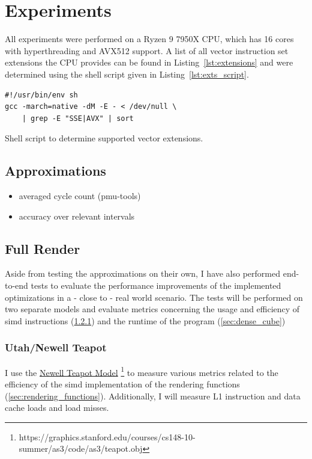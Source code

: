 \documentclass[a4paper, 11pt]{memoir}
\begin{document}
    \chapter{Experiments}
    \label{ch:experiments}
    
    All experiments were performed on a Ryzen 9 7950X CPU, which has 16 cores with hyperthreading and AVX512 support.
    A list of all vector instruction set extensions the CPU provides can be found in Listing~\ref{lst:extensions} and
    were determined using the shell script given in Listing~\ref{lst:exts_script}.
    \begin{listing}[H]
        \begin{verbatim}
#!/usr/bin/env sh
gcc -march=native -dM -E - < /dev/null \
    | grep -E "SSE|AVX" | sort
        \end{verbatim}
        \caption{Shell script to determine supported vector extensions.}
        \label{lst:exts_script}
    \end{listing}

    \section{Approximations}
    \begin{itemize}
        \item averaged cycle count (pmu-tools)
        \item accuracy over relevant intervals
    \end{itemize}


    \section{Full Render}
    Aside from testing the approximations on their own, I have also performed end-to-end tests
    to evaluate the performance improvements of the implemented optimizations in a - close to - real world scenario.
    The tests will be performed on two separate models and evaluate metrics concerning the usage and efficiency of
    \gls{simd} instructions (\ref{sec:utah_teapot}) and the runtime of the program (\ref{sec:dense_cube})

    \subsection{Utah/Newell Teapot}
    \label{sec:utah_teapot}
    I use the \href{https://graphics.stanford.edu/courses/cs148-10-summer/as3/code/as3/teapot.obj}{Newell Teapot Model}
    \footnote{https://graphics.stanford.edu/courses/cs148-10-summer/as3/code/as3/teapot.obj} to measure various metrics
    related to the efficiency of the \gls{simd} implementation of the rendering functions (\ref{sec:rendering_functions}).
    Additionally, I will measure L1 instruction and data cache loads and load misses.
\end{document}
